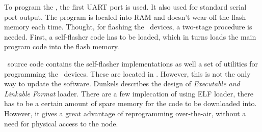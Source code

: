   To program the , the first UART port is used. It also
 used for standard serial port output. The program is localed into
 RAM and doesn't wear-off the flash memory each time. Thought, for
 flashing the \MCX\ devices, a two-stage procedure is needed. First,
 a self-flasher code has to be loaded, which in turns loads the
 main program code into the flash memory.
 
  \Contiki\ source code contains the self-flasher implementations as
 well a set of utilities for programming the \MCX\ devices. These are
 located in . However, this is not the only
 way to update the software. Dunkels describes the design of \Contiki
 \emph{Executable and Linkable Format} \cite{dunkels06runtime} loader.
 There are a few implecation of using ELF loader, there has to be
 a certain amount of spare memory for the code to be downloaded into.
 However, it gives a great advantage of reprogramming over-the-air,
 without a need for physical access to the node.

